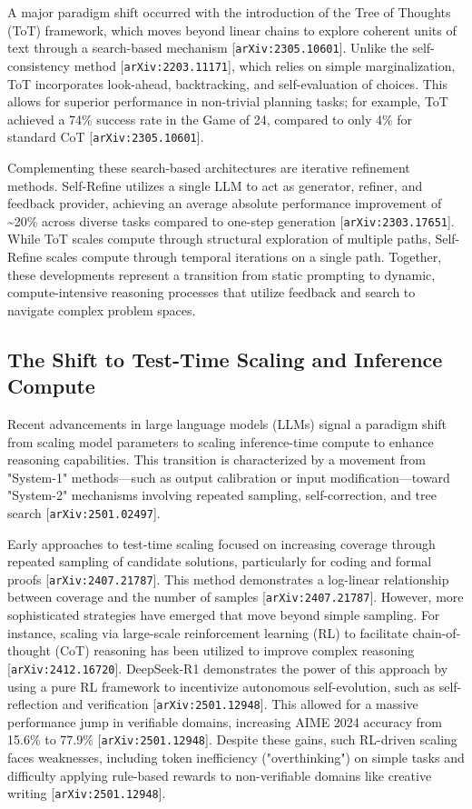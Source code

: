 \documentclass[11pt]{article}
\begin{document}
A major paradigm shift occurred with the introduction of the Tree of Thoughts (ToT) framework, which moves beyond linear chains to explore coherent units of text through a search-based mechanism [\texttt{arXiv:2305.10601}]. Unlike the self-consistency method [\texttt{arXiv:2203.11171}], which relies on simple marginalization, ToT incorporates look-ahead, backtracking, and self-evaluation of choices. This allows for superior performance in non-trivial planning tasks; for example, ToT achieved a 74\% success rate in the Game of 24, compared to only 4\% for standard CoT [\texttt{arXiv:2305.10601}].

Complementing these search-based architectures are iterative refinement methods. Self-Refine utilizes a single LLM to act as generator, refiner, and feedback provider, achieving an average absolute performance improvement of \textasciitilde{}20\% across diverse tasks compared to one-step generation [\texttt{arXiv:2303.17651}]. While ToT scales compute through structural exploration of multiple paths, Self-Refine scales compute through temporal iterations on a single path. Together, these developments represent a transition from static prompting to dynamic, compute-intensive reasoning processes that utilize feedback and search to navigate complex problem spaces.

\subsection{The Shift to Test-Time Scaling and Inference Compute}

Recent advancements in large language models (LLMs) signal a paradigm shift from scaling model parameters to scaling inference-time compute to enhance reasoning capabilities. This transition is characterized by a movement from "System-1" methods—such as output calibration or input modification—toward "System-2" mechanisms involving repeated sampling, self-correction, and tree search [\texttt{arXiv:2501.02497}].

Early approaches to test-time scaling focused on increasing coverage through repeated sampling of candidate solutions, particularly for coding and formal proofs [\texttt{arXiv:2407.21787}]. This method demonstrates a log-linear relationship between coverage and the number of samples [\texttt{arXiv:2407.21787}]. However, more sophisticated strategies have emerged that move beyond simple sampling. For instance, scaling via large-scale reinforcement learning (RL) to facilitate chain-of-thought (CoT) reasoning has been utilized to improve complex reasoning [\texttt{arXiv:2412.16720}]. DeepSeek-R1 demonstrates the power of this approach by using a pure RL framework to incentivize autonomous self-evolution, such as self-reflection and verification [\texttt{arXiv:2501.12948}]. This allowed for a massive performance jump in verifiable domains, increasing AIME 2024 accuracy from 15.6\% to 77.9\% [\texttt{arXiv:2501.12948}]. Despite these gains, such RL-driven scaling faces weaknesses, including token inefficiency ("overthinking") on simple tasks and difficulty applying rule-based rewards to non-verifiable domains like creative writing [\texttt{arXiv:2501.12948}].
\end{document}
